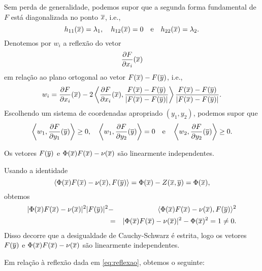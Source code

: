 Sem perda de generalidade, podemos supor que a segunda forma
fundamental de $F$ est\'a diagonalizada no ponto $\overline{x}$, i.e.,
\[
h_{11}(\overline{x})=\lambda_1, \quad h_{12}(\overline{x}) = 0 \quad\mbox{e}\quad
h_{22}(\overline{x}) = \lambda_2.
\]
Denotemos por $w_i$ a reflex\~ao do vetor
\[
\frac{\partial F}{\partial x_i}(\overline{x})
\]
em rela\c c\~ao ao plano ortogonal ao vetor $F(\overline{x}) - F(\overline{y})$, i.e.,
\begin{eqnarray}\label{eq:reflexao}
w_i = \frac{\partial F}{\partial x_i}(\overline{x}) - 
2 \left\langle \frac{\partial F}{\partial x_i}(\overline{x}), \frac{F(\overline{x}) - 
	F(\overline{y})}{|F(\overline{x}) - F(\overline{y})|} \right\rangle \frac{F(\overline{x}) - 
	F(\overline{y})}{|F(\overline{x}) - F(\overline{y})|}.
\end{eqnarray}
Escolhendo um sistema de coordenadas apropriado $(y_1,y_2)$,
podemos supor que
\begin{equation*}
\left\langle w_1, \frac{\partial F}{\partial y_1}(\overline{y}) \right\rangle \geq 0, 
\quad 
\left\langle w_1, \frac{\partial F}{\partial y_2}(\overline{y}) \right\rangle = 0 
\quad \text{e} \quad 
\left\langle w_2, \frac{\partial F}{\partial y_2}(\overline{y}) \right\rangle \geq 0.
\end{equation*}

\begin{lema}
	Os vetores $F(\overline{y})$ e $ \Phi(\overline{x}) F(\overline{x}) - \nu(\overline{x}) $ são linearmente independentes.
\end{lema}
\begin{demonstracao}
	Usando a identidade
	\[
	\langle \Phi(\overline{x}) F(\overline{x}) - \nu(\overline{x}), F(\overline{y}) \rangle = 
	\Phi(\overline{x}) - Z(\overline{x},\overline{y}) = \Phi(\overline{x}),
	\]
	obtemos
	\begin{eqnarray*}
		| \Phi(\overline{x}) F(\overline{x}) - \nu(\overline{x}) |^2 | F(\overline{y}) |^2 &-& 
		\langle \Phi(\overline{x}) F(\overline{x}) - \nu(\overline{x}), F(\overline{y}) \rangle^2 \\
		&=& | \Phi(\overline{x}) F(\overline{x}) - \nu(\overline{x}) |^2 - \Phi(\overline{x})^2 = 1 \neq 0.
	\end{eqnarray*}
	Disso decorre que a desigualdade de Cauchy-Schwarz \'e estrita,
	logo os vetores $F(\overline{y})$ e $\Phi(\overline{x})F(\overline{x})-\nu(\overline{x})$
	s\~ao linearmente independentes.
\end{demonstracao}

Em rela\c c\~ao \`a reflex\~ao dada em \eqref{eq:reflexao}, obtemos o
seguinte:

